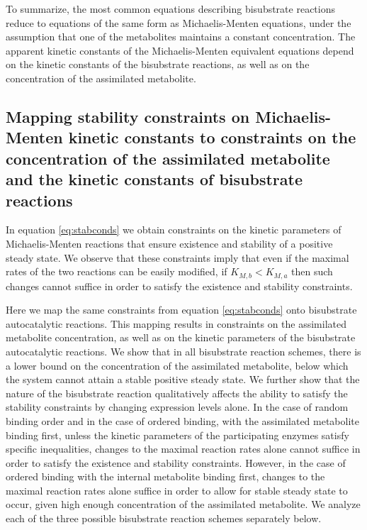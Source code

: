   To summarize, the most common equations describing bisubstrate reactions reduce to equations of the same form as Michaelis-Menten equations, under the assumption that one of the metabolites maintains a constant concentration.
  The apparent kinetic constants of the Michaelis-Menten equivalent equations depend on the kinetic constants of the bisubstrate reactions, as well as on the concentration of the assimilated metabolite.


  \subsection{Mapping stability constraints on Michaelis-Menten kinetic constants to constraints on the concentration of the assimilated metabolite and the kinetic constants of bisubstrate reactions}
  In equation \ref{eq:stabconds} we obtain constraints on the kinetic parameters of Michaelis-Menten reactions that ensure existence and stability of a positive steady state.
  We observe that these constraints imply that even if the maximal rates of the two reactions can be easily modified, if $K_{M,b}<K_{M,a}$ then such changes cannot suffice in order to satisfy the existence and stability constraints.
  
  Here we map the same constraints from equation \ref{eq:stabconds} onto bisubstrate autocatalytic reactions.
  This mapping results in constraints on the assimilated metabolite concentration, as well as on the kinetic parameters of the bisubstrate autocatalytic reactions.
  We show that in all bisubstrate reaction schemes, there is a lower bound on the concentration of the assimilated metabolite, below which the system cannot attain a stable positive steady state.
  We further show that the nature of the bisubstrate reaction qualitatively affects the ability to satisfy the stability constraints by changing expression levels alone.
  In the case of random binding order and in the case of ordered binding, with the assimilated metabolite binding first, unless the kinetic parameters of the participating enzymes satisfy specific inequalities, changes to the maximal reaction rates alone cannot suffice in order to satisfy the existence and stability constraints.
  However, in the case of ordered binding with the internal metabolite binding first, changes to the maximal reaction rates alone suffice in order to allow for stable steady state to occur, given high enough concentration of the assimilated metabolite.
  We analyze each of the three possible bisubstrate reaction schemes separately below.


